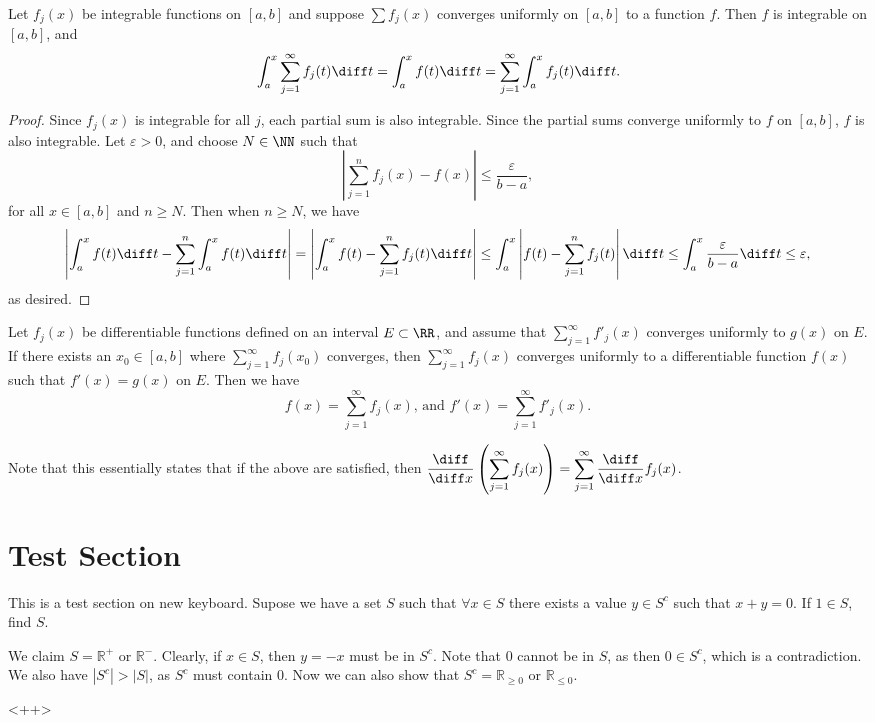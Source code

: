 \begin{theorem}
Let $f_j(x)$ be integrable functions on $[a,b]$ and suppose $\sum f_j(x)$ converges uniformly on $[a,b]$ to a function $f$. Then $f$ is integrable on $[a,b]$, and 
\[ \int_a^x \sum_{j=1}^\infty f_j(t) \diff t = \int_a^x f(t) \diff t = \sum_{j=1}^\infty \int_a^x f_j(t) \diff t. \]
\end{theorem}
\begin{proof}
Since $f_j(x)$ is integrable for all $j$, each partial sum is also integrable. Since the partial sums converge uniformly to $f$ on $[a,b]$, $f$ is also integrable. Let $\varepsilon > 0$, and choose $N \in \NN$ such that 
\[ \left | \sum_{j=1}^n f_j(x) - f(x) \right | \leq \dfrac{\varepsilon}{b-a}, \] for all $x \in [a,b]$ and $n \geq N$. Then when $n \geq N$, we have 
\[ \left | \int_a^x f(t) \diff t - \sum_{j=1}^n \int_a^x f(t) \diff t \right | = \left | \int_a^x f(t) - \sum_{j=1}^n f_j(t) \diff t \right | \leq \int_a^x \left |f(t) - \sum_{j=1}^n f_j(t) \right | \diff t \leq \int_a^x \dfrac{\varepsilon}{b-a} \diff t \leq \varepsilon, \] as desired. 
\end{proof}
\newpage
\begin{theorem}
Let $f_j(x)$ be differentiable functions defined on an interval $E \subset \RR$, and assume that $\sum\limits_{j=1}^\infty f'_j(x)$ converges uniformly to $g(x)$ on $E$. If there exists an $x_0 \in [a,b]$ where $\sum\limits_{j=1}^\infty f_j(x_0)$ converges, then $\sum\limits_{j=1}^\infty f_j(x)$ converges uniformly to a differentiable function $f(x)$ such that $f'(x) = g(x)$ on $E$. Then we have 
\[ f(x) = \sum_{j=1}^\infty f_j(x) \text{, and } f'(x) = \sum_{j=1}^\infty f'_j(x). \] 
\end{theorem}
Note that this essentially states that if the above are satisfied, then $\dfrac{\diff}{\diff x} \left ( \displaystyle\sum_{j=1}^\infty f_j(x) \right ) = \displaystyle\sum_{j=1}^\infty \dfrac{\diff}{\diff x} f_j(x)$. 


\section{Test Section}
This is a test section on new keyboard. Supose we have a set $S$ such that $\forall x \in S$ there exists a value $y \in S^c$ such that $x+y = 0$. If $1 \in S$, find $S$. 
\begin{sol}
We claim $S = \mathbb{R}^+$ or $\mathbb{R}^-$. Clearly, if $x \in S$, then $y = -x$ must be in $S^c$. Note that 0 cannot be in $S$, as then $0 \in S^c$, which is a contradiction. We also have $|S^c| > |S|$, as $S^c$ must contain 0. Now we can also show that $S^c = \mathbb{R}_{\geq 0}$ or $\mathbb{R}_{\leq 0}$. 
\end{sol}<++>
